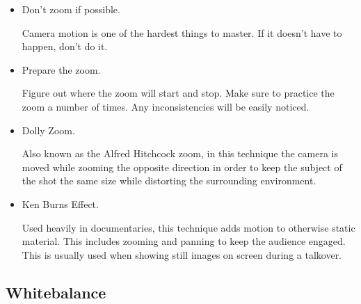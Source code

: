 \documentclass[letterpaper]{latexclasses/tmarticle}
\begin{document}
\begin{itemize}
    \item
    Don't zoom if possible.
    
    Camera motion is one of the hardest things to master.  If it doesn't have to
    happen, don't do it.
    
    \item
    Prepare the zoom.
    
    Figure out where the zoom will start and stop.  Make sure to practice the
    zoom a number of times.  Any inconsistencies will be easily noticed.
    
    \item
    Dolly Zoom.
    
    Also known as the Alfred Hitchcock zoom, in this technique the camera is
    moved while zooming the opposite direction in order to keep the subject of
    the shot the same size while distorting the surrounding environment.
    
    \item
    Ken Burns Effect.
    
    Used heavily in documentaries, this technique adds motion to otherwise
    static material.  This includes zooming and panning to keep the audience
    engaged.  This is usually used when showing still images on screen during a
    talkover.

\end{itemize}

\subsection{Whitebalance}

\end{document}
